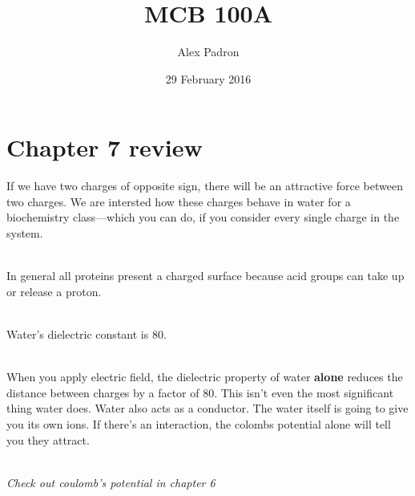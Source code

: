 \documentclass{article}
\title{MCB 100A}
\author{Alex Padron}
\date{29 February 2016}
\begin{document}
\maketitle

\section{Chapter 7 review}

If we have two charges of opposite sign, there will be an attractive force between two charges. We are intersted how these charges behave in water for a biochemistry class––which you can do, if you consider every single charge in the system.

\mbox{ }\\
In general all proteins present a charged surface because acid groups can take up or release a proton.

\mbox{ }\\
Water's dielectric constant is 80\epsilon.  

\mbox{}\\
When you apply electric field, the dielectric property of water \textbf{alone} reduces the distance between charges by a factor of 80. This isn't even the most significant thing water does. Water also acts as a conductor. The water itself is going to give you its own ions. If there's an interaction, the colombs potential alone will tell you they attract.

\mbox{}\\
\textit{Check out coulomb's potential in chapter 6}
\end{document}
